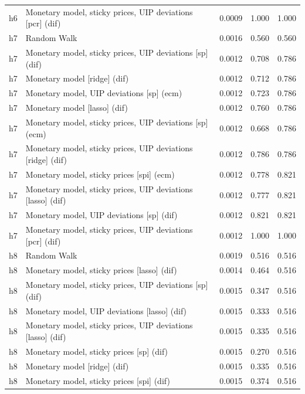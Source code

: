 \begin{ThreePartTable}
\begin{longtable}[t]{cp{5.5cm}ccc}
h6 & \raggedright Monetary model, sticky prices, UIP deviations [pcr] (dif) & 0.0009 & 1.000 & 1.000\\
\addlinespace
h7 & \raggedright Random Walk & 0.0016 & 0.560 & 0.560\\
h7 & \raggedright Monetary model, sticky prices, UIP deviations [sp] (dif) & 0.0012 & 0.708 & 0.786\\
h7 & \raggedright Monetary model [ridge] (dif) & 0.0012 & 0.712 & 0.786\\
h7 & \raggedright Monetary model, UIP deviations [sp] (ecm) & 0.0012 & 0.723 & 0.786\\
h7 & \raggedright Monetary model [lasso] (dif) & 0.0012 & 0.760 & 0.786\\
h7 & \raggedright Monetary model, sticky prices, UIP deviations [sp] (ecm) & 0.0012 & 0.668 & 0.786\\
h7 & \raggedright Monetary model, sticky prices, UIP deviations [ridge] (dif) & 0.0012 & 0.786 & 0.786\\
h7 & \raggedright Monetary model, sticky prices [spi] (ecm) & 0.0012 & 0.778 & 0.821\\
h7 & \raggedright Monetary model, sticky prices, UIP deviations [lasso] (dif) & 0.0012 & 0.777 & 0.821\\
h7 & \raggedright Monetary model, UIP deviations [sp] (dif) & 0.0012 & 0.821 & 0.821\\
h7 & \raggedright Monetary model, sticky prices, UIP deviations [pcr] (dif) & 0.0012 & 1.000 & 1.000\\
\addlinespace
h8 & \raggedright Random Walk & 0.0019 & 0.516 & 0.516\\
h8 & \raggedright Monetary model, sticky prices [lasso] (dif) & 0.0014 & 0.464 & 0.516\\
h8 & \raggedright Monetary model, sticky prices, UIP deviations [sp] (dif) & 0.0015 & 0.347 & 0.516\\
h8 & \raggedright Monetary model, UIP deviations [lasso] (dif) & 0.0015 & 0.333 & 0.516\\
h8 & \raggedright Monetary model, sticky prices, UIP deviations [lasso] (dif) & 0.0015 & 0.335 & 0.516\\
h8 & \raggedright Monetary model, sticky prices [sp] (dif) & 0.0015 & 0.270 & 0.516\\
h8 & \raggedright Monetary model [ridge] (dif) & 0.0015 & 0.335 & 0.516\\
h8 & \raggedright Monetary model, sticky prices [spi] (dif) & 0.0015 & 0.374 & 0.516\\

\end{longtable}
\end{ThreePartTable}

